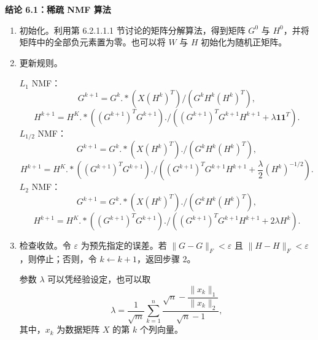 \par\medskip{}
\noindent\textbf{结论 6.1：稀疏 NMF 算法}\par
\begin{enumerate}[label=步骤 \arabic*. ,leftmargin=4.6em]
\item 初始化。利用第 6.2.1.1.1 节讨论的矩阵分解算法，得到矩阵 $G^0$ 与 $H^0$，并将矩阵中的全部负元素置为零。也可以将 $W$ 与 $H$ 初始化为随机正矩阵。
\item 更新规则。

$L_1$ NMF：
\begin{equation}
G^{k+1}=G^k\mathbin{.*}(X(H^k)^T)\big/(G^kH^k(H^k)^T),
\tag{6.19}
\end{equation}
\begin{equation}
H^{k+1}=H^K\mathbin{.*}((G^{k+1})^TG^{k+1})
\mathbin{./}((G^{k+1})^TG^{k+1}H^{k+1}+\lambda\mathbf1\mathbf1^T).
\tag{6.20}
\end{equation}
$L_{1/2}$ NMF：
\begin{equation}
G^{k+1}=G^k\mathbin{.*}(X(H^k)^T)\mathbin{./}(G^kH^k(H^k)^T),
\tag{6.21}
\end{equation}
\begin{equation}
H^{k+1}=H^K\mathbin{.*}((G^{k+1})^TG^{k+1})
\mathbin{./}\left((G^{k+1})^TG^{k+1}H^{k+1}+\frac\lambda2(H^k)^{-1/2}\right).
\tag{6.22}
\end{equation}
$L_2$ NMF：
\begin{equation}
G^{k+1}=G^k\mathbin{.*}(X(H^k)^T)\mathbin{./}(G^kH^k(H^k)^T),
\tag{6.23}
\end{equation}
\begin{equation}
H^{k+1}=H^K\mathbin{.*}((G^{k+1})^TG^{k+1})
\mathbin{./}((G^{k+1})^TG^{k+1}H^{k+1}+2\lambda H^k).
\tag{6.24}
\end{equation}
\item 检查收敛。令 $\varepsilon$ 为预先指定的误差。若 $\lVert G-G\rVert_F<\varepsilon$ 且 $\lVert H-H\rVert_F<\varepsilon$，则停止；否则，令 $k\leftarrow k+1$，返回步骤 2。

参数 $\lambda$ 可以凭经验设定，也可以取
\[
\lambda=\frac1{\sqrt m}\sum_{k=1}^n
\frac{\sqrt n-\dfrac{\lVert x_k\rVert_1}{\lVert x_k\rVert_2}}{\sqrt n-1},
\]
其中，$x_k$ 为数据矩阵 $X$ 的第 $k$ 个列向量。
\end{enumerate}
